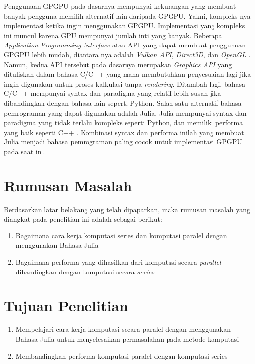 
Penggunaan GPGPU pada dasarnya mempunyai kekurangan yang membuat banyak
pengguna memilih alternatif lain daripada GPGPU. Yakni, kompleks nya
implementasi ketika ingin menggunakan GPGPU. Implementasi yang kompleks ini
muncul karena GPU mempunyai jumlah inti yang banyak. Beberapa \emph{Application
	Programming Interface} atau API \citep{evansonExplainerWhatAPI2021} yang dapat
membuat penggunaan GPGPU lebih mudah, diantara nya adalah \emph{Vulkan API},
\emph{Direct3D}, dan \emph{OpenGL}
\citep{khairySurveyArchitecturalApproaches2019}. Namun, kedua API tersebut pada
dasarnya merupakan \emph{Graphics API} yang dituliskan dalam bahasa C/C++ yang
mana membutuhkan penyesuaian lagi jika ingin digunakan untuk proses kalkulasi
tanpa \emph{rendering}. Ditambah lagi, bahasa C/C++ mempunyai syntax dan
paradigma yang relatif lebih susah jika dibandingkan dengan bahasa lain seperti
Python. Salah satu alternatif bahasa pemrograman yang dapat digunakan adalah
Julia. Julia mempunyai syntax dan paradigma yang tidak terlalu kompleks seperti
Python, dan memiliki performa yang baik seperti C++
\cite{bezansonJuliaMicroBenchmarks2023}. Kombinasi syntax dan performa inilah
yang membuat Julia menjadi bahasa pemrograman paling cocok untuk implementasi
GPGPU pada saat ini.

\section{Rumusan Masalah}
Berdasarkan latar belakang yang telah dipaparkan, maka rumusan masalah yang
diangkat pada penelitian ini adalah sebagai berikut:
\begin{enumerate}
	\item Bagaimana cara kerja komputasi series dan komputasi paralel dengan menggunakan
	      Bahasa Julia

	\item Bagaimana performa yang dihasilkan dari komputasi secara \emph{parallel}
	      dibandingkan dengan komputasi secara \emph{series}
\end{enumerate}

\section{Tujuan Penelitian}
\begin{enumerate}
	\item Mempelajari cara kerja komputasi secara paralel dengan menggunakan Bahasa Julia
	      untuk menyelesaikan permasalahan pada metode komputasi

	\item Membandingkan performa komputasi paralel dengan komputasi series
\end{enumerate}

